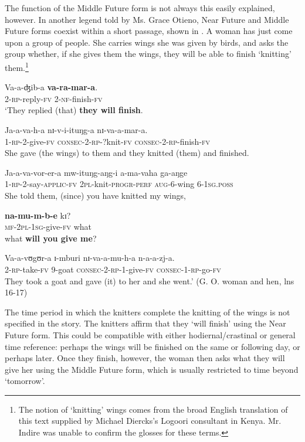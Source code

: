 \documentclass[output=paper]{langsci/langscibook}
\begin{document}
The function of the Middle Future form is not always this easily explained, however. In another legend told by Ms. Grace Otieno, Near Future and Middle Future forms coexist within a short passage, shown in . A woman has just come upon a group of people. She carries wings she was given by birds, and asks the group whether, if she gives them the wings, they will be able to finish ‘knitting’ them.\footnote{ The notion of ‘knitting’ wings comes from the broad English translation of this text supplied by Michael Diercks’s Logoori consultant in Kenya. Mr. Indire was unable to confirm the glosses for these terms.}

\ea\label{ex:sarvasy:13}
\gll Va-a-ʤib-a   \textbf{va-ra-mar-a}. \\
2\textsc{{}-rp}{}-reply-\textsc{fv}  2-\textsc{nf-}finish-\textsc{fv} \\
\glt ‘They replied (that) \textbf{they will finish}.

\gll Ja-a-va-h-a     nɪ-v-i-ituŋg-a     nɪ-va-a-mar-a. \\
1\textsc{{}-rp-2}{}-give-\textsc{fv}    \textsc{consec-2-rp}{}-?knit-\textsc{fv}  \textsc{consec-2-rp-}finish-\textsc{fv} \\
\glt She gave (the wings) to them and they knitted (them) and finished.

\gll Ja-a-va-vor-er-a     mw-ituŋg-aŋg-i   a-ma-vaha   ga-aŋge \\
1-\textsc{rp-}2-say-\textsc{applic-fv}    \textsc{2pl-}knit-\textsc{progr-perf}  \textsc{aug-}6-wing  6-\textsc{1sg.poss} \\
\glt She told them, (since) you have knitted my wings, 

\gll \textbf{na-mu-m-b-e}       kɪ?  \\
\textsc{mf-2pl-1sg-}give-\textsc{fv}    what \\
\glt what \textbf{will you give me}?

\gll Va-a-vʊgʊr-a    ɪ{}-mburi  nɪ-va-a-mu-h-a    n-a-a-zj-a. \\
2\textsc{{}-rp}{}-take-\textsc{fv}    9-goat    \textsc{consec-2-rp}{}-1-give-\textsc{fv}  \textsc{consec-1-rp-}go-\textsc{fv} \\
\glt They took a goat and gave (it) to her and she went.’ (G. O. woman and hen, lns 16-17)
\z

The time period in which the knitters complete the knitting of the wings is not specified in the story. The knitters affirm that they ‘will finish’ using the Near Future form. This could be compatible with either hodiernal/crastinal or general time reference: perhaps the wings will be finished on the same or following day, or perhaps later. Once they finish, however, the woman then asks what they will give her using the Middle Future form, which is usually restricted to time beyond ‘tomorrow’. 
\end{document}
